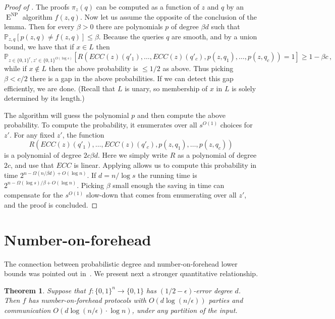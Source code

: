 \documentclass{toc}
\newtheorem{thm}[theorem]{Theorem}
\DeclareMathOperator{\NP}{\mathrm{NP}}  %
\DeclareMathOperator{\EEE}{\mathrm{E}}  %
\newcommand{\zo}{\{0, 1\}}
\renewcommand{\P}{\mathbb{P}}
\newcommand{\e}{\epsilon}
\begin{document}
\begin{proof}[Proof of ]
The proofs $\pi_{z}(q)$ can be computed as a function of $z$ and
$q$ by an $\EEE^{\NP}$ algorithm $f(z,q)$. Now let us assume the opposite
of the conclusion of the lemma. Then for every $\beta>0$ there are
polynomials $p$ of degree $\beta d$ such that $\P_{z,q}[p(z,q)\ne f(z,q)]\le\beta$.
Because the queries $q$ are smooth, and by a union bound, we have
that if $x\in L$ then
\[
\P_{z\in\zo^{r},z'\in\zo^{O(\log s)}}[R(ECC(z)(q'_{1}),\ldots,ECC(z)(q'_{c}),p(z,q_{1}),\ldots,p(z,q_{c}))=1]\ge1-\beta c\,,
\]
while if $x\not\in L$ then the above probability is $\le1/2$ as
above. Thus picking $\beta<c/2$ there is a gap in the above probabilities.
If we can detect this gap efficiently, we are done. (Recall that $L$
is unary, so membership of $x$ in $L$ is solely determined by its
length.)

The algorithm will guess the polynomial $p$ and then compute the
above probability. To compute the probability, it enumerates over
all $s^{O(1)}$ choices for $z'$. For any fixed $z'$, the function
\[
R(ECC(z)(q'_{1}),\ldots,ECC(z)(q'_{c}),p(z,q_{1}),\ldots,p(z,q_{c}))
\]
is a polynomial of degree $2c\beta d$. Here we simply write $R$
as a polynomial of degree $2c$, and use that $ECC$ is linear. Applying
 allows us to compute this probability
in time $2^{n-\Omega(n/\beta d)+O(\log n)}$. If $d=n/\log s$ the
running time is $2^{n-\Omega(\log s)/\beta+O(\log n)}$. Picking $\beta$
small enough the saving in time can compensate for the $s^{O(1)}$
slow-down that comes from enumerating over all $z'$, and the proof
is concluded.
\end{proof}

\section{Number-on-forehead \label{sec:Number-on-forehead}}

The connection between probabilistic degree and number-on-forehead
lower bounds was pointed out in~\cite{Viola-map}. We present next
a stronger quantitative relationship.
\begin{thm}
\label{thm:NOF-connection}Suppose that $f:\zo^{n}\to\zo$ has $(1/2-\e)$-error
degree $d$. Then $f$ has number-on-forehead protocols with $O(d\log(n/\e))$
parties and communication $O(d\log(n/\e)\cdot\log n)$, under any
partition of the input.
\end{thm}
\end{document}
